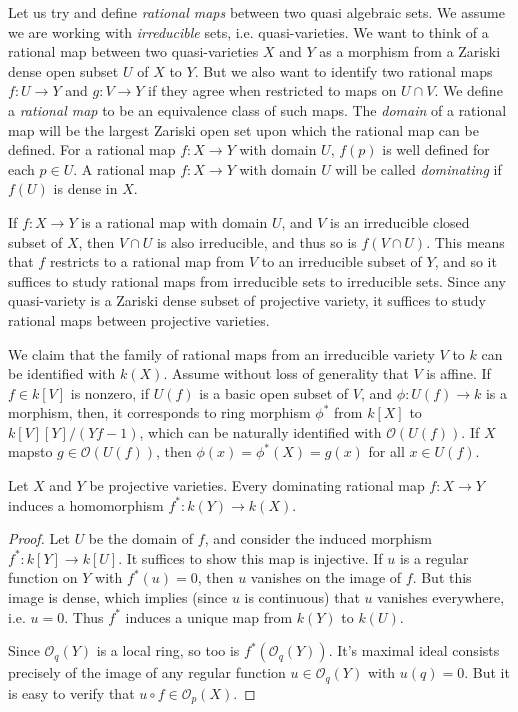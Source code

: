Let us try and define \emph{rational maps} between two quasi algebraic sets. We assume we are working with \emph{irreducible} sets, i.e. quasi-varieties. We want to think of a rational map between two quasi-varieties $X$ and $Y$ as a morphism from a Zariski dense open subset $U$ of $X$ to $Y$. But we also want to identify two rational maps $f: U \to Y$ and $g: V \to Y$ if they agree when restricted to maps on $U \cap V$. We define a \emph{rational map} to be an equivalence class of such maps. The \emph{domain} of a rational map will be the largest Zariski open set upon which the rational map can be defined. For a rational map $f: X \to Y$ with domain $U$, $f(p)$ is well defined for each $p \in U$. A rational map $f: X \to Y$ with domain $U$ will be called \emph{dominating} if $f(U)$ is dense in $X$.

If $f: X \to Y$ is a rational map with domain $U$, and $V$ is an irreducible closed subset of $X$, then $V \cap U$ is also irreducible, and thus so is $f(V \cap U)$. This means that $f$ restricts to a rational map from $V$ to an irreducible subset of $Y$, and so it suffices to study rational maps from irreducible sets to irreducible sets. Since any quasi-variety is a Zariski dense subset of projective variety, it suffices to study rational maps between projective varieties.

\begin{example}
    We claim that the family of rational maps from an irreducible variety $V$ to $k$ can be identified with $k(X)$. Assume without loss of generality that $V$ is affine. If $f \in k[V]$ is nonzero, if $U(f)$ is a basic open subset of $V$, and $\phi: U(f) \to k$ is a morphism, then, it corresponds to ring morphism $\phi^*$ from $k[X]$ to $k[V][Y]/(Yf - 1)$, which can be naturally identified with $\mathcal{O}(U(f))$. If $X$ mapsto $g \in \mathcal{O}(U(f))$, then $\phi(x) = \phi^*(X) = g(x)$ for all $x \in U(f)$.
\end{example}

\begin{lemma}
    Let $X$ and $Y$ be projective varieties. Every dominating rational map $f: X \to Y$ induces a homomorphism $f^*: k(Y) \to k(X)$.
\end{lemma}
\begin{proof}
    Let $U$ be the domain of $f$, and consider the induced morphism $f^*: k[Y] \to k[U]$. It suffices to show this map is injective. If $u$ is a regular function on $Y$ with $f^*(u) = 0$, then $u$ vanishes on the image of $f$. But this image is dense, which implies (since $u$ is continuous) that $u$ vanishes everywhere, i.e. $u = 0$. Thus $f^*$ induces a unique map from $k(Y)$ to $k(U)$.

    Since $\mathcal{O}_q(Y)$ is a local ring, so too is $f^*(\mathcal{O}_q(Y))$. It's maximal ideal consists precisely of the image of any regular function $u \in \mathcal{O}_q(Y)$ with $u(q) = 0$. But it is easy to verify that $u \circ f \in \mathcal{O}_p(X)$.
\end{proof}

